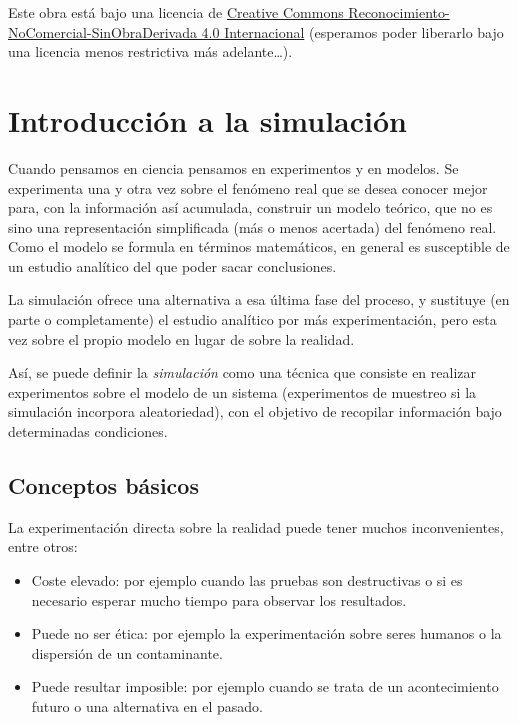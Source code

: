 \documentclass[
]{book}
\theoremstyle{break}
\theoremstyle{nonumberplain}
\begin{document}
Este obra está bajo una licencia de \href{https://creativecommons.org/licenses/by-nc-nd/4.0/deed.es_ES}{Creative Commons Reconocimiento-NoComercial-SinObraDerivada 4.0 Internacional}
(esperamos poder liberarlo bajo una licencia menos restrictiva más adelante\ldots).

\hypertarget{intro}{%
\chapter{Introducción a la simulación}\label{intro}}

Cuando pensamos en ciencia pensamos en experimentos y en modelos.
Se experimenta una y otra vez sobre el fenómeno real que se desea conocer mejor para, con la información así acumulada, construir un modelo teórico, que no es sino una representación simplificada (más o menos acertada) del fenómeno real.
Como el modelo se formula en términos matemáticos, en general es susceptible de un estudio analítico del que poder sacar conclusiones.

La simulación ofrece una alternativa a esa última fase del proceso, y sustituye (en parte o completamente) el estudio analítico por más experimentación, pero esta vez sobre el propio modelo en lugar de sobre la realidad.

Así, se puede definir la \emph{simulación} como una técnica que consiste en realizar experimentos sobre el modelo de un sistema (experimentos de muestreo si la simulación incorpora aleatoriedad), con el objetivo de recopilar información bajo determinadas condiciones.

\hypertarget{conceptos-buxe1sicos}{%
\section{Conceptos básicos}\label{conceptos-buxe1sicos}}

La experimentación directa sobre la realidad puede tener muchos inconvenientes, entre otros:

\begin{itemize}
\item
  Coste elevado: por ejemplo cuando las pruebas son destructivas o si es necesario esperar mucho tiempo para observar los resultados.
\item
  Puede no ser ética: por ejemplo la experimentación sobre seres humanos o la dispersión de un contaminante.
\item
  Puede resultar imposible: por ejemplo cuando se trata de un acontecimiento futuro o una alternativa en el pasado.
\end{itemize}
\end{document}
